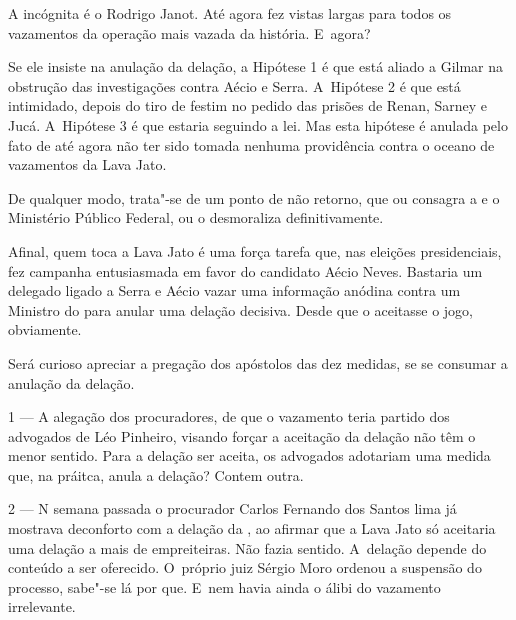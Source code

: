 A incógnita é o  Rodrigo Janot. Até agora fez vistas largas para
todos os vazamentos da operação mais vazada da história. E~agora?

Se ele insiste na anulação da delação, a Hipótese 1 é que está aliado a
Gilmar na obstrução das investigações contra Aécio e Serra. A~Hipótese 2
é que está intimidado, depois do tiro de festim no pedido das prisões de
Renan, Sarney e Jucá. A~Hipótese 3 é que estaria seguindo a lei. Mas
esta hipótese é anulada pelo fato de até agora não ter sido tomada
nenhuma providência contra o oceano de vazamentos da Lava Jato.

De qualquer modo, trata"-se de um ponto de não retorno, que ou consagra a
 e o Ministério Público Federal, ou o desmoraliza definitivamente.

Afinal, quem toca a Lava Jato é uma força tarefa que, nas eleições
presidenciais, fez campanha entusiasmada em favor do candidato Aécio
Neves. Bastaria um delegado ligado a Serra e Aécio vazar uma informação
anódina contra um Ministro do  para anular uma delação decisiva.
Desde que o  aceitasse o jogo, obviamente.

Será curioso apreciar a pregação dos apóstolos das dez medidas, se se
consumar a anulação da delação.

1 --- A alegação dos procuradores, de que o vazamento teria partido
dos advogados de Léo Pinheiro, visando forçar a aceitação da delação não
têm o menor sentido. Para a delação ser aceita, os advogados adotariam
uma medida que, na práitca, anula a delação? Contem outra.

 2 --- N semana passada o procurador Carlos Fernando dos Santos lima
já mostrava deconforto com a delação da , ao afirmar que a Lava Jato
só aceitaria uma delação a mais de empreiteiras. Não fazia sentido. A~delação depende do conteúdo a ser oferecido. O~próprio juiz Sérgio Moro
ordenou a suspensão do processo, sabe"-se lá por que. E~nem havia ainda o
álibi do vazamento irrelevante.~
